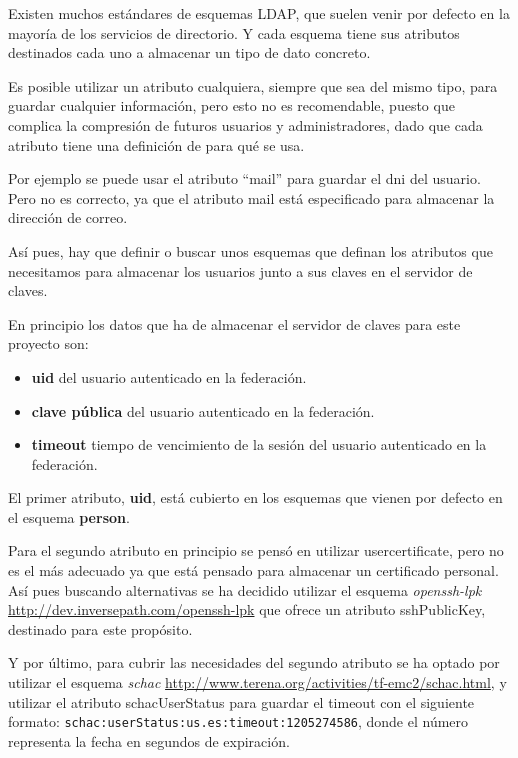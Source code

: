     Existen muchos estándares de esquemas LDAP, que suelen venir por defecto
    en la mayoría de los servicios de directorio. Y cada esquema tiene sus
    atributos destinados cada uno a almacenar un tipo de dato concreto.

    Es posible utilizar un atributo cualquiera, siempre que sea del mismo
    tipo, para guardar cualquier información, pero esto no es recomendable,
    puesto que complica la compresión de futuros usuarios y
    administradores, dado que cada atributo tiene una definición de para qué
    se usa.

    Por ejemplo se puede usar el atributo ``mail'' para guardar el dni del
    usuario. Pero no es correcto, ya que el atributo mail está especificado
    para almacenar la dirección de correo.

    Así pues, hay que definir o buscar unos esquemas que definan los
    atributos que necesitamos para almacenar los usuarios junto a sus claves
    en el servidor de claves.

    En principio los datos que ha de almacenar el servidor de claves para
    este proyecto son:

    \begin{itemize}

    \item \textbf{uid} del usuario autenticado en la federación.
    \item \textbf{clave pública} del usuario autenticado en la federación.
    \item \textbf{timeout} tiempo de vencimiento de la sesión del usuario autenticado en la federación.

    \end{itemize}

    El primer atributo, \textbf{uid}, está cubierto en los esquemas que vienen
    por defecto en el esquema \textbf{person}.

    Para el segundo atributo en principio se pensó en utilizar
    usercertificate, pero no es el más adecuado ya que está pensado para
    almacenar un certificado personal. Así pues buscando alternativas se ha
    decidido utilizar el esquema \textit{openssh-lpk}
    \url{http://dev.inversepath.com/openssh-lpk} que ofrece un atributo
    sshPublicKey, destinado para este propósito.

    Y por último, para cubrir las necesidades del segundo atributo se ha
    optado por utilizar el esquema \textit{schac}
    \url{http://www.terena.org/activities/tf-emc2/schac.html}, y utilizar
    el atributo schacUserStatus para guardar el timeout con el siguiente
    formato: \texttt{schac:userStatus:us.es:timeout:1205274586}, donde el
    número representa la fecha en segundos de expiración.

